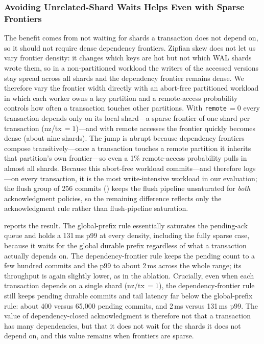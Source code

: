 \subsubsection{Avoiding Unrelated-Shard Waits Helps Even with Sparse Frontiers}

The benefit comes from not waiting for shards a transaction does not depend on,
so it should not require dense dependency frontiers.  Zipfian skew does not let
us vary frontier density: it changes which keys are hot
but not which WAL shards wrote them, so in a non-partitioned workload the
writers of the accessed versions stay spread across all shards and the
dependency frontier remains dense.  We therefore vary the frontier width
directly with an abort-free partitioned workload in which each worker owns
a key partition and a remote-access probability controls how often a
transaction touches other partitions.  With \texttt{remote}\,$=0$ every
transaction depends only on its local shard---a sparse frontier of one
shard per transaction (nz/tx\,$=1$)---and with remote accesses the
frontier quickly becomes dense (about nine shards).  The jump is abrupt
because dependency frontiers compose transitively---once a transaction touches
a remote partition it inherits that partition's own frontier---so even a 1\%
remote-access probability pulls in almost all shards.  Because this
abort-free workload commits---and therefore logs---on every transaction,
it is the most write-intensive workload in our evaluation; the flush group
of 256 commits () keeps the flush pipeline unsaturated
for \emph{both} acknowledgment policies, so the remaining difference
reflects only the acknowledgment rule rather than flush-pipeline
saturation.

reports the result.  The global-prefix rule
essentially saturates the pending-ack queue and holds a 131\,ms p99 at
every density, including the fully sparse case, because it waits for the
global durable prefix regardless of what a transaction actually depends
on.  The
dependency-frontier rule keeps the pending count to a few hundred
commits and the p99 to about 2\,ms across the whole
range; its throughput is again slightly lower, as in the ablation.
Crucially, even when each transaction depends on a single shard
(nz/tx\,$=1$), the dependency-frontier rule still keeps pending durable
commits and tail latency far below the global-prefix rule: about
400 versus 65{,}000 pending commits, and 2\,ms versus 131\,ms p99.  The value of dependency-closed acknowledgment
is therefore not that a transaction has many dependencies, but that it
does not wait for the shards it does not depend on, and this value
remains when frontiers are sparse.


